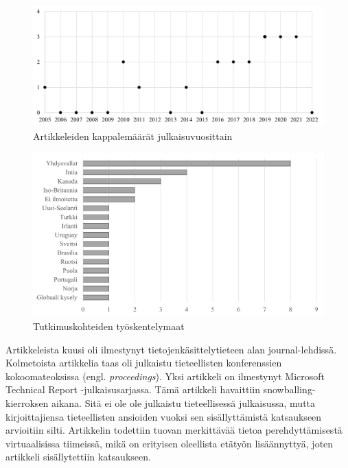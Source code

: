 \documentclass[utf8]{gradu3}
\begin{document}
\begin{figure}[h]
    \centering
    \includegraphics[width=\textwidth]{media/kappalemaarat-julkaisuvuosittain-tiivis.png}
    \caption{Artikkeleiden kappalemäärät julkaisuvuosittain}
    \label{kuvio:kappalemaarat-julkaisuvuosittain-tiivis}
\end{figure}

\begin{figure}[h]
    \centering
    \includegraphics[width=\textwidth]{media/maat.png}
    \caption{Tutkimuskohteiden työskentelymaat}
    \label{kuvio:maat}
\end{figure}

Artikkeleista kuusi oli ilmestynyt tietojenkäsittelytieteen alan journal-lehdissä. Kolmetoista artikkelia taas oli julkaistu tieteellisten konferenssien kokoomateoksissa (engl. \textit{proceedings}). Yksi artikkeli \parencite{hemphill-begel-2011} on ilmestynyt Microsoft Technical Report -julkaisusarjassa. Tämä artikkeli havaittiin snowballing-kierroksen aikana. Sitä ei ole ole julkaistu tieteellisessä julkaisussa, mutta kirjoittajiensa tieteellisten ansioiden vuoksi sen sisällyttämistä katsaukseen arvioitiin silti. Artikkelin todettiin tuovan merkittävää tietoa perehdyttämisestä virtuaalisissa tiimeissä, mikä on erityisen oleellista etätyön lisäännyttyä, joten artikkeli sisällytettiin katsaukseen.
\end{document}
